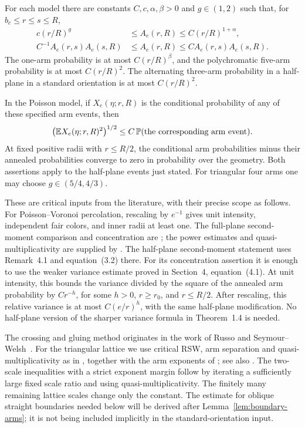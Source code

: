 \begin{lemma}\label{lem:arm-inputs}
For each model there are constants $C,c,\alpha,\beta>0$ and
$g\in(1,2)$ such that, for $b_e\le r\le s\le R$,
\begin{align}
 c(r/R)^g&\le A_e(r,R)\le C(r/R)^{1+\alpha},\label{eq:four-powers}\\
 C^{-1}A_e(r,s)A_e(s,R)&\le A_e(r,R)
       \le C A_e(r,s)A_e(s,R).\label{eq:qm}
\end{align}
The one-arm probability is at most $C(r/R)^\beta$, and the
polychromatic five-arm probability is at most $C(r/R)^2$.
The alternating three-arm probability in a half-plane in a standard
orientation is at most $C(r/R)^2$.

In the Poisson model, if $X_e(\eta;r,R)$ is the conditional probability
of any of these specified arm events, then
\begin{equation}\label{eq:arm-second-moment}
 \bigl(\mathbb E X_e(\eta;r,R)^2\bigr)^{1/2}
       \le C\,\mathbb P(\text{the corresponding arm event}).
\end{equation}
At fixed positive radii with $r\le R/2$, the conditional arm probabilities
minus their annealed probabilities converge to zero in probability over
the geometry.  Both assertions apply to the half-plane events just stated.
For triangular four arms one may choose $g\in(5/4,4/3)$.
\end{lemma}

These are critical inputs from the literature, with their precise scope
as follows.  For Poisson--Voronoi percolation, rescaling by $e^{-1}$ gives
unit intensity, independent fair colors, and inner radii at least one.
The full-plane second-moment comparison and concentration are
\cite[Theorem~1.4]{vanneuville-quantitative}; the power estimates and
quasi-multiplicativity are supplied by
\cite[Propositions~3.1--3.4 and~6.2]{vanneuville-quantitative}.
The half-plane second-moment statement uses Remark~4.1 and equation~(3.2)
there.  For its concentration assertion it is enough to use the weaker
variance estimate proved in Section~4, equation~(4.1).  At unit intensity,
this bounds the variance divided by the square of the annealed arm
probability by $Cr^{-h}$, for some $h>0$, $r\ge r_0$, and $r\le R/2$.
After rescaling, this relative variance is at most $C(e/r)^h$, with the
same half-plane modification.  No half-plane version of the sharper
variance formula in Theorem~1.4 is needed.

The crossing and gluing method originates in the work of Russo and
Seymour--Welsh~\cite{russo78,seymourwelsh78}.
For the triangular lattice we use critical RSW, arm separation and
quasi-multiplicativity as in \cite[Sections~2.3 and~4]{nolin08}, together with
the arm exponents of \cite{smirnovwerner01}; see also
\cite[Theorems~21--22]{nolin08}.  The two-scale inequalities with a
strict exponent margin follow by iterating a sufficiently large fixed
scale ratio and using quasi-multiplicativity.  The finitely many remaining
lattice scales change only the constant.  The estimate for oblique
straight boundaries needed below will be derived after
Lemma~\ref{lem:boundary-arms}; it is not being included implicitly in
the standard-orientation input.

